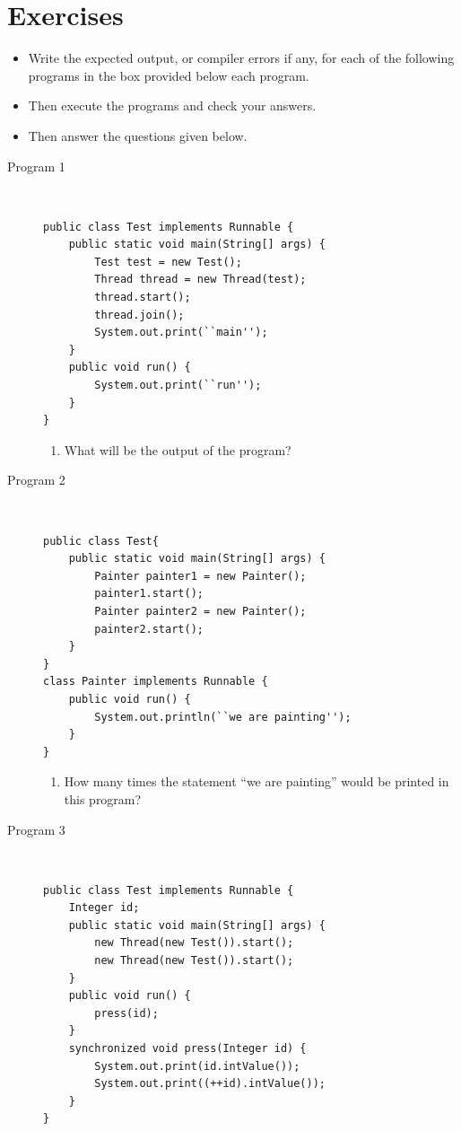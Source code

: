\documentclass[11pt,a4paper]{article}
\def\AnswerBox{\fbox{\begin{minipage}{4in}\hfill\vspace{0.5in}\end{minipage}}}
\begin{document}
\section*{Exercises}
\begin{itemize}
    \item Write the expected output, or compiler errors if any, for each of the following programs in the box provided below each program.
    \item Then execute the programs and check your answers.
    \item Then answer the questions given below.
\end{itemize}
\begin{description}
\item [Program 1] \
\begin{lstlisting}
public class Test implements Runnable {
    public static void main(String[] args) {
        Test test = new Test();
        Thread thread = new Thread(test);
        thread.start();
        thread.join();
        System.out.print(``main'');
    }
    public void run() {
        System.out.print(``run'');
    }
}
\end{lstlisting}

\AnswerBox

\begin{enumerate}[label=\bfseries Q\arabic*:]\itemsep10pt
\item What will be the output of the program?
\end{enumerate}

\item [Program 2] \
\begin{lstlisting}
public class Test{
    public static void main(String[] args) {
        Painter painter1 = new Painter();
        painter1.start();
        Painter painter2 = new Painter();
        painter2.start();
    }
}
class Painter implements Runnable {
    public void run() {
        System.out.println(``we are painting'');
    }
}
\end{lstlisting}

\AnswerBox

\begin{enumerate}[label=\bfseries Q\arabic*:]\itemsep10pt
        \item How many times the statement ``we are painting'' would be printed in this program?
    \end{enumerate}

\item [Program 3] \
\begin{lstlisting}
public class Test implements Runnable {
    Integer id;
    public static void main(String[] args) {
        new Thread(new Test()).start();
        new Thread(new Test()).start();
    }
    public void run() {
        press(id);
    }
    synchronized void press(Integer id) {
        System.out.print(id.intValue());
        System.out.print((++id).intValue());
    }
}
\end{lstlisting}


\end{description}
\end{document}
